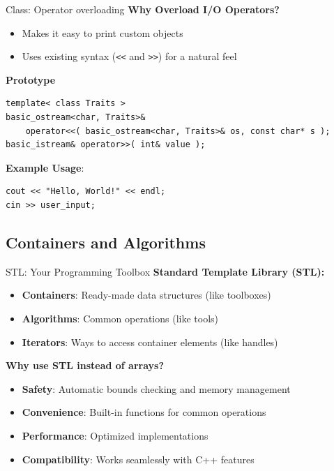 \begin{frame}[fragile]{Class: Operator overloading}
    \textbf{Why Overload I/O Operators?}
    \begin{itemize}
        \item Makes it easy to print custom objects
        \item Uses existing syntax (\texttt{<<} and \texttt{>>}) for a natural feel
    \end{itemize}

    \textbf{Prototype}
    \begin{verbatim}
template< class Traits >
basic_ostream<char, Traits>&
    operator<<( basic_ostream<char, Traits>& os, const char* s );
basic_istream& operator>>( int& value );
    \end{verbatim}
    \textbf{Example Usage}:
	\begin{verbatim}
cout << "Hello, World!" << endl;
cin >> user_input;
    \end{verbatim}
\end{frame}

\subsection{Containers and Algorithms}
\begin{frame}[fragile]{STL: Your Programming Toolbox}
	\textbf{Standard Template Library (STL):}
	\begin{itemize}
		\item \textbf{Containers}: Ready-made data structures (like toolboxes)
		\item \textbf{Algorithms}: Common operations (like tools)
		\item \textbf{Iterators}: Ways to access container elements (like handles)
	\end{itemize}

	\vspace{0.5em}
	\textbf{Why use STL instead of arrays?}
	\begin{itemize}
		\item \textbf{Safety}: Automatic bounds checking and memory management
		\item \textbf{Convenience}: Built-in functions for common operations
		\item \textbf{Performance}: Optimized implementations
		\item \textbf{Compatibility}: Works seamlessly with C++ features
	\end{itemize}
\end{frame}

